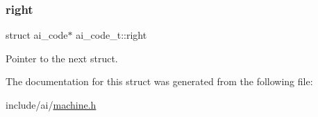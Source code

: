 \subsubsection{\texorpdfstring{right}{right}}
{\footnotesize\ttfamily struct ai\+\_\+code$\ast$ ai\+\_\+code\+\_\+t\+::right}

Pointer to the next struct. 

The documentation for this struct was generated from the following file\+:\begin{DoxyCompactItemize}
\item 
include/ai/\hyperlink{machine_8h}{machine.\+h}\end{DoxyCompactItemize}

